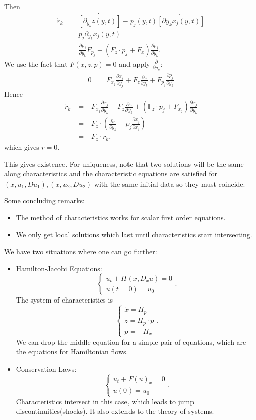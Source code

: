 \documentclass[11pt]{scrartcl}
\newcommand{\F}{\mathbb{F}}
\begin{document}
Then 
\begin{align*}
\dot r_k &= \dot{[\partial_{y_k}z(y, t)]} - p_j(y, t)\dot{[\partial y_k x_j(y, t)]}\\
&=p_j \partial_{y_k}x_j(y, t)\\
&= \frac{\partial p_j}{\partial y_k} F_{p_j} - (F_z \cdot p_j + F_x) \frac{\partial p_j}{\partial y_k}.
\end{align*}
We use the fact that $F(x, z, p) = 0$ and apply $\frac{\partial}{\partial y_k}$:
\begin{align*}
0 &=F_{x_j} \frac{\partial x_j}{\partial y_j} + F_z \frac{\partial z}{\partial y_k} + F_{p_j} \frac{\partial p_j}{\partial y_k}
\end{align*}
Hence 
\begin{align*}
\dot r_k &= - F_{x_j} \frac{\partial x_j}{\partial y_k} - F_z \frac{\partial z}{\partial y_k} + (\F_z\cdot p_j + F_{x_j})\frac{\partial x_j}{\partial y_k} \\
&= -F_z\cdot \left (\frac{\partial z}{\partial y_k} - p_j\frac{\partial x_j}{\partial x_j}\right )\\
&= -F_z \cdot r_k,
\end{align*}
which gives $r=0$.

This gives existence.  For uniqueness, note that two solutions will be the same along characteristics and the characteristic equations are satisfied for $(x, u_1, Du_1), (x, u_2, Du_2)$ with the same initial data so they must coincide.

Some concluding remarks:
\begin{itemize}
\item The method of characteristics works for scalar first order equations.
\item We only get local solutions which last until characteristics start intersecting.
\end{itemize}

We have two situations where one can go further:
\begin{itemize}
\item Hamilton-Jacobi Equations:
$$\begin{cases}
u_t + H(x, D_xu) = 0\\
u(t=0) = u_0
\end{cases}.
$$The system of characteristics is 
$$\begin{cases}
\dot x = H_p \\
\dot z = H_p \cdot p \\
\dot p = -H_x
\end{cases}.$$
We can drop the middle equation for a simple pair of equations, which are the equations for Hamiltonian flows.
\item Conservation Laws:
$$\begin{cases}
u_t + F(u)_x= 0\\
u(0) = u_0
\end{cases}.
$$
Characteristics intersect in this case, which leads to jump discontinuities(shocks).  It also extends to the theory of systems.
\end{itemize}
\pagebreak
\end{document}
